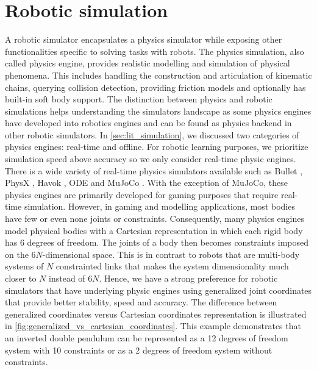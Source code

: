 \documentclass[\home/main.tex]{subfiles}
\begin{document}

\section{Robotic simulation}

A robotic simulator encapsulates a physics simulator while exposing other functionalities specific to solving tasks with robots. The physics simulation, also called physics engine, provides realistic modelling and simulation of physical phenomena. This includes handling the construction and articulation of kinematic chains, querying collision detection, providing friction models and optionally has built-in soft body support.
The distinction between physics and robotic simulations helps understanding the simulators landscape as some physics engines have developed into robotics engines and can be found as physics backend in other robotic simulators.
In \cref{sec:lit_simulation}, we discussed two categories of physics engines: real-time and offline. For robotic learning purposes, we prioritize simulation speed above accuracy so we only consider real-time physic engines. There is a wide variety of real-time physics simulators available such as Bullet \autocite{Bullet}, PhysX \autocite{PhysX}, Havok \autocite{Havok}, ODE \autocite{ODE} and MuJoCo \autocite{Mujoco}.
With the exception of MuJoCo, these physics engines are primarily developed for gaming purposes that require real-time simulation. However, in gaming and modelling applications, most bodies have few or even none joints or constraints. Consequently, many physics engines model physical bodies with a Cartesian representation in which each rigid body has 6 degrees of freedom. The joints of a body then becomes constraints imposed on the $6N$-dimensional space. This is in contrast to robots that are multi-body systems of $N$ constrainted links that makes the system dimensionality much closer to $N$ instead of $6N$. Hence, we have a strong preference for robotic simulators that have underlying physic engines using generalized joint coordinates that provide better stability, speed and accuracy. The difference between generalized coordinates versus Cartesian coordinates representation is illustrated in \cref{fig:generalized_vs_cartesian_coordinates}. This example demonstrates that an inverted double pendulum can be represented as a 12 degrees of freedom system with 10 constraints or as a 2 degrees of freedom system without constraints.
\end{document}
